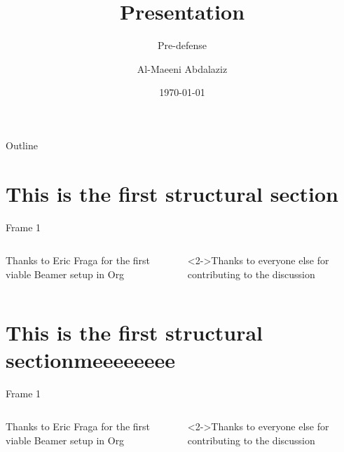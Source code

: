 \documentclass[presentation]{beamer}
\author{Al-Maeeni Abdalaziz}
\date{\today}
\title{Presentation}
\subtitle{Pre-defense}
\begin{document}
\maketitle
\begin{frame}{Outline}
\tableofcontents
\end{frame}


\section{This is the first structural section}
\label{sec:orge74266a}

\begin{frame}[label={sec:orga7c1f3e}]{Frame 1}
\begin{columns}
\begin{column}{0.48\columnwidth}
\begin{block}{Thanks to Eric Fraga}
for the first viable Beamer setup in Org
\end{block}
\end{column}
\begin{column}{0.48\columnwidth}
\begin{block}<2->{Thanks to everyone else}
for contributing to the discussion
\end{block}
\end{column}
\end{columns}
\end{frame}



\section{This is the first structural sectionmeeeeeeee}
\label{sec:org6a770f4}

\begin{frame}[label={sec:orgd89b75b}]{Frame 1}
\begin{columns}
\begin{column}{0.48\columnwidth}
\begin{block}{Thanks to Eric Fraga}
for the first viable Beamer setup in Org
\end{block}
\end{column}
\begin{column}{0.48\columnwidth}
\begin{block}<2->{Thanks to everyone else}
for contributing to the discussion
\end{block}
\end{column}
\end{columns}
\end{frame}
\end{document}
